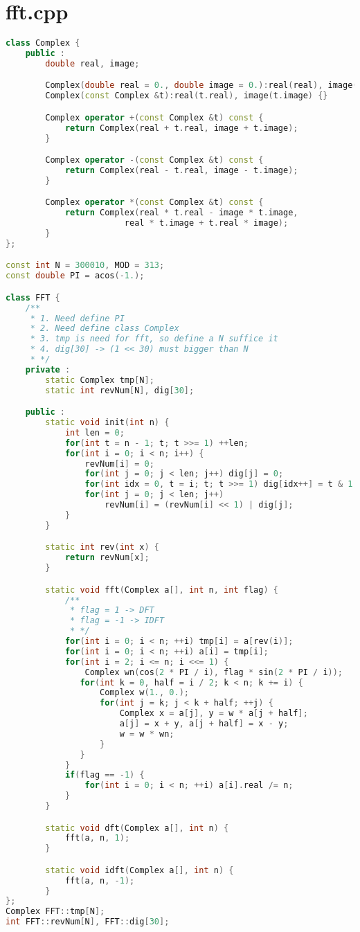 \section{fft.cpp}
\begin{lstlisting}[language=c++]
class Complex {
	public :
		double real, image;

		Complex(double real = 0., double image = 0.):real(real), image(image) {}
		Complex(const Complex &t):real(t.real), image(t.image) {}

		Complex operator +(const Complex &t) const {
			return Complex(real + t.real, image + t.image);
		}

		Complex operator -(const Complex &t) const {
			return Complex(real - t.real, image - t.image);
		}

		Complex operator *(const Complex &t) const {
			return Complex(real * t.real - image * t.image, 
						real * t.image + t.real * image);
		}
};

const int N = 300010, MOD = 313;
const double PI = acos(-1.);

class FFT {
	/**
	 * 1. Need define PI
	 * 2. Need define class Complex
	 * 3. tmp is need for fft, so define a N suffice it
	 * 4. dig[30] -> (1 << 30) must bigger than N
	 * */
	private :
		static Complex tmp[N];
		static int revNum[N], dig[30];

	public :
		static void init(int n) {
			int len = 0;
			for(int t = n - 1; t; t >>= 1) ++len;
			for(int i = 0; i < n; i++) {
				revNum[i] = 0;
				for(int j = 0; j < len; j++) dig[j] = 0;
				for(int idx = 0, t = i; t; t >>= 1) dig[idx++] = t & 1;
				for(int j = 0; j < len; j++)
					revNum[i] = (revNum[i] << 1) | dig[j];
			}
		}

		static int rev(int x) {
			return revNum[x];
		}

		static void fft(Complex a[], int n, int flag) {
			/**
			 * flag = 1 -> DFT
			 * flag = -1 -> IDFT
			 * */
			for(int i = 0; i < n; ++i) tmp[i] = a[rev(i)];
			for(int i = 0; i < n; ++i) a[i] = tmp[i];
			for(int i = 2; i <= n; i <<= 1) {
				Complex wn(cos(2 * PI / i), flag * sin(2 * PI / i));
			   for(int k = 0, half = i / 2; k < n; k += i) {
				   Complex w(1., 0.);
				   for(int j = k; j < k + half; ++j) {
					   Complex x = a[j], y = w * a[j + half];
					   a[j] = x + y, a[j + half] = x - y;
					   w = w * wn;
				   }
			   }
			}
			if(flag == -1) {
				for(int i = 0; i < n; ++i) a[i].real /= n;
			}
		}

		static void dft(Complex a[], int n) {
			fft(a, n, 1);
		}

		static void idft(Complex a[], int n) {
			fft(a, n, -1);
		}
};
Complex FFT::tmp[N];
int FFT::revNum[N], FFT::dig[30];


\end{lstlisting}
